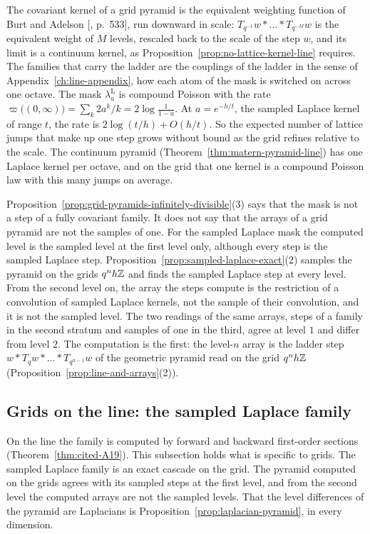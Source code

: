 The covariant kernel of a grid pyramid is the equivalent weighting function of Burt and Adelson
[, p.~533], run downward in scale: $T_{q^{-1}}w * \dots * T_{q^{-M}}w$ is
the equivalent weight of $M$ levels, rescaled back to the scale of the step $w$, and its limit is a continuum
kernel, as Proposition~\ref{prop:no-lattice-kernel-line} requires. The families that carry the
ladder are the couplings of the ladder in the sense of Appendix~\ref{ch:line-appendix}, how each
atom of the mask is switched on across one octave. The mask $\lambda^{\mathrm{L}}_a$ is compound
Poisson with the rate $\varpi\bigl((0,\infty)\bigr) = \sum_k2a^k/k = 2\log\tfrac{1}{1-a}$. At
$a = e^{-h/t}$, the sampled Laplace kernel of range $t$, the rate is
$2\log(t/h) + O(h/t)$. So the expected number of lattice jumps that make up one step grows without
bound as the grid refines relative to the scale. The continuum \Matern{} pyramid
(Theorem~\ref{thm:matern-pyramid-line}) has one Laplace kernel per octave, and on the grid that one
kernel is a compound Poisson law with this many jumps on average.

Proposition~\ref{prop:grid-pyramids-infinitely-divisible}(3) says that the mask is not a step of a
fully covariant family. It does not say that the arrays of a grid pyramid are not the samples of
one. For the sampled Laplace mask the computed level is the sampled \Matern{} level at the first
level only, although every step is the sampled Laplace step.
Proposition~\ref{prop:sampled-laplace-exact}(2) samples the \Matern{} pyramid on the grids
$q^nh\mathbb{Z}$ and finds the sampled Laplace step at every level. From the second level on, the array
the steps compute is the restriction of a convolution of sampled Laplace kernels, not the sample of
their convolution, and it is not the sampled \Matern{} level. The two readings of the same arrays,
steps of a family in the second stratum and samples of one in the third, agree at level $1$ and
differ from level $2$. The computation is the first: the level-$n$ array is the ladder step
$w * T_qw * \dots * T_{q^{n-1}}w$ of the geometric pyramid read on the grid $q^nh\mathbb{Z}$
(Proposition~\ref{prop:line-and-arrays}(2)).

\subsection{Grids on the line: the sampled Laplace family}
\label{subsec:sampled-laplace}

On the line the \Matern{} family is computed by forward and backward first-order sections
 (Theorem~\ref{thm:cited-A19}). This subsection holds what is specific to grids. The sampled Laplace family is
an exact cascade on the grid. The \Matern{} pyramid computed on the grids agrees with its sampled
steps at the first level, and from the second level the computed arrays are not the sampled levels. That the level
differences of the \Matern{} pyramid are Laplacians is Proposition~\ref{prop:laplacian-pyramid}, in
every dimension.

